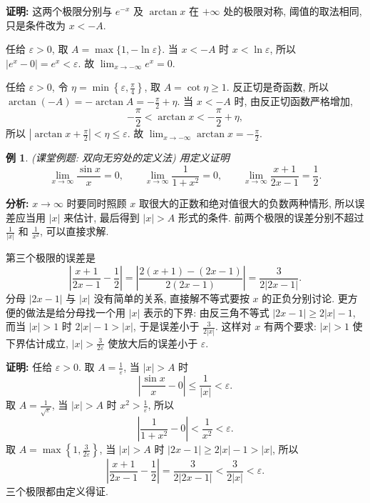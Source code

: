 \documentclass[UTF8,openany]{ctexbook}
\theoremstyle{chinesetextbook}
\newtheorem{example}{例}[section]
\newenvironment{cnproof}{\par\indent\textbf{证明:} \ignorespaces}{\par}
\begin{document}
\begin{cnproof}
这两个极限分别与 $e^{-x}$ 及 $\arctan x$ 在 $+\infty$ 处的极限对称, 阈值的取法相同, 只是条件改为 $x<-A$.

任给 $\varepsilon>0$, 取 $A=\max\{1,-\ln\varepsilon\}$. 当 $x<-A$ 时 $x<\ln\varepsilon$, 所以 $|e^x-0|=e^x<\varepsilon$. 故 $\displaystyle\lim_{x\to-\infty}e^x=0$.

任给 $\varepsilon>0$, 令 $\displaystyle\eta=\min\left\{\varepsilon,\frac\pi4\right\}$, 取 $A=\cot\eta\ge1$. 反正切是奇函数, 所以 $\displaystyle\arctan(-A)=-\arctan A=-\frac\pi2+\eta$. 当 $x<-A$ 时, 由反正切函数严格增加,
\[
-\frac\pi2<\arctan x<-\frac\pi2+\eta,
\]
所以 $\displaystyle\left|\arctan x+\frac\pi2\right|<\eta\le\varepsilon$. 故 $\displaystyle\lim_{x\to-\infty}\arctan x=-\frac\pi2$.
\end{cnproof}
\begin{example}
\textnormal{(课堂例题: 双向无穷处的定义法)} 用定义证明
\[
\lim_{x\to\infty}\frac{\sin x}x=0,\qquad\lim_{x\to\infty}\frac1{1+x^2}=0,\qquad\lim_{x\to\infty}\frac{x+1}{2x-1}=\frac12.
\]
\end{example}
\par\indent\textbf{分析:} $x\to\infty$ 时要同时照顾 $x$ 取很大的正数和绝对值很大的负数两种情形, 所以误差应当用 $|x|$ 来估计, 最后得到 $|x|>A$ 形式的条件. 前两个极限的误差分别不超过 $\displaystyle\frac1{|x|}$ 和 $\displaystyle\frac1{x^2}$, 可以直接求解.

第三个极限的误差是
\[
\left|\frac{x+1}{2x-1}-\frac12\right|=\left|\frac{2(x+1)-(2x-1)}{2(2x-1)}\right|=\frac3{2|2x-1|}.
\]
分母 $|2x-1|$ 与 $|x|$ 没有简单的关系, 直接解不等式要按 $x$ 的正负分别讨论. 更方便的做法是给分母找一个用 $|x|$ 表示的下界: 由反三角不等式 $|2x-1|\ge2|x|-1$, 而当 $|x|>1$ 时 $2|x|-1>|x|$, 于是误差小于 $\displaystyle\frac3{2|x|}$. 这样对 $x$ 有两个要求: $|x|>1$ 使下界估计成立, $\displaystyle|x|>\frac3{2\varepsilon}$ 使放大后的误差小于 $\varepsilon$.
\begin{cnproof}
任给 $\varepsilon>0$. 取 $\displaystyle A=\frac1\varepsilon$, 当 $|x|>A$ 时
\[
\left|\frac{\sin x}x-0\right|\le\frac1{|x|}<\varepsilon.
\]
取 $\displaystyle A=\frac1{\sqrt\varepsilon}$, 当 $|x|>A$ 时 $\displaystyle x^2>\frac1\varepsilon$, 所以
\[
\left|\frac1{1+x^2}-0\right|<\frac1{x^2}<\varepsilon.
\]
取 $\displaystyle A=\max\left\{1,\frac3{2\varepsilon}\right\}$, 当 $|x|>A$ 时 $|2x-1|\ge2|x|-1>|x|$, 所以
\[
\left|\frac{x+1}{2x-1}-\frac12\right|=\frac3{2|2x-1|}<\frac3{2|x|}<\varepsilon.
\]
三个极限都由定义得证.
\end{cnproof}
\end{document}
